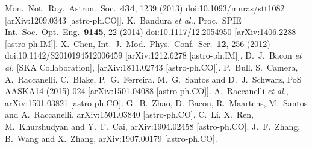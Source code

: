 \documentclass[aps,prd,amsmath,amssymb,showpacs,floats,floatfix,nofootinbib,reprint]{revtex4-1}
\begin{document}
\begin{thebibliography}{99}
  Mon.\ Not.\ Roy.\ Astron.\ Soc.\  {\bf 434}, 1239 (2013)
  doi:10.1093/mnras/stt1082
  [arXiv:1209.0343 [astro-ph.CO]].
  K.~Bandura {\it et al.},
  Proc.\ SPIE Int.\ Soc.\ Opt.\ Eng.\  {\bf 9145}, 22 (2014)
  doi:10.1117/12.2054950
  [arXiv:1406.2288 [astro-ph.IM]].
  X.~Chen,
  Int.\ J.\ Mod.\ Phys.\ Conf.\ Ser.\  {\bf 12}, 256 (2012)
  doi:10.1142/S2010194512006459
  [arXiv:1212.6278 [astro-ph.IM]].
  D.~J.~Bacon {\it et al.} [SKA Collaboration],
  [arXiv:1811.02743 [astro-ph.CO]].
  P.~Bull, S.~Camera, A.~Raccanelli, C.~Blake, P.~G.~Ferreira, M.~G.~Santos and D.~J.~Schwarz,
  PoS AASKA14 (2015) 024
  [arXiv:1501.04088 [astro-ph.CO]].
  A.~Raccanelli {\it et al.},
  arXiv:1501.03821 [astro-ph.CO].
  G.~B.~Zhao, D.~Bacon, R.~Maartens, M.~Santos and A.~Raccanelli,
  arXiv:1501.03840 [astro-ph.CO].
  C.~Li, X.~Ren, M.~Khurshudyan and Y.~F.~Cai,
  arXiv:1904.02458 [astro-ph.CO].
  J.~F.~Zhang, B.~Wang and X.~Zhang,
  arXiv:1907.00179 [astro-ph.CO].



\end{thebibliography}
\end{document}
